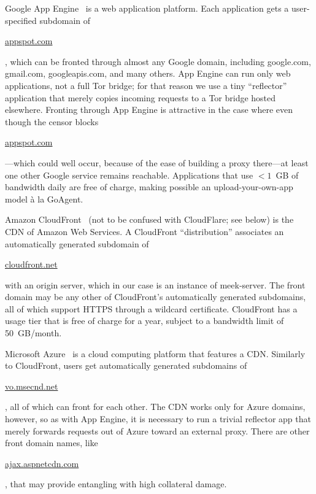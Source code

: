\documentclass{sig-alternate}
\newcommand{\meekserver}{\mbox{meek-server}\xspace}
\def\urll#1{\begin{NoHyper}\url{#1}\end{NoHyper}}
\begin{document}
Google App Engine~\cite{googleappengine}
is a web application platform.
Each application gets a user-specified subdomain of \urll{appspot.com},
which can be fronted through almost any Google domain,
including google.com, gmail.com, googleapis.com, and many others.
App Engine can run only web applications,
not a full Tor bridge;
for that reason we use a tiny ``reflector'' application
that merely copies incoming requests to a Tor bridge hosted elsewhere.
Fronting through App Engine is attractive in the case where even though
the censor blocks
\urll{appspot.com}---which could well occur,
because of the ease of building a proxy there---at least one
other Google service remains reachable.
Applications that use $< 1$~GB of bandwidth daily
are free of charge,
making possible an upload-your-own-app model
à la GoAgent.

Amazon CloudFront~\cite{cloudfront}
(not to be confused with CloudFlare; see below)
is the CDN of Amazon Web Services.
A CloudFront ``distribution'' associates
an automatically generated subdomain of \urll{cloudfront.net}
with an origin server,
which in our case is an instance of \meekserver.
The front domain may be any other of CloudFront's automatically generated subdomains, all
of which support HTTPS through a wildcard certificate.
CloudFront has a usage tier that is free of charge for a year,
subject to a bandwidth limit of 50~GB/month.

Microsoft Azure~\cite{azure}
is a cloud computing platform that features a CDN.
Similarly to CloudFront, users get automatically generated subdomains
of \urll{vo.msecnd.net},
all of which can front for each other.
The CDN works only for Azure domains, however,
so as with App Engine, it is necessary to run a trivial reflector app
that merely forwards requests out of Azure toward an external proxy.
There are other front domain names, like \urll{ajax.aspnetcdn.com},
that may provide entangling with high collateral damage.
\end{document}
